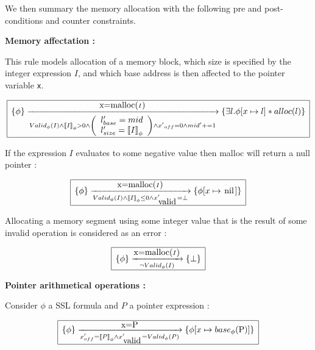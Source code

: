 \documentclass[a4paper,twoside,12pt]{report}
\newcommand{\Alloc}[1]{alloc(#1)}
\newcommand{\Unsep}[0]{\ast}
\newcommand{\Sep}[2]{#1 \Unsep #2}
\newcommand{\Pointsto}[2]{ #1 \mapsto #2}
\newcommand{\nil}[0]{\lstinline!nil!}
\newcommand{\Addrep}[2]{#1 \lbrack #2 \rbrack}
\newcommand{\base}[2]{base_{#1}(#2)}
\newcommand{\lbase}[1]{#1_{base}}
\newcommand{\lsize}[1]{#1_{size}}
\newcommand{\locvar}[3]{
\left ( \begin{array}{l}
\lbase{#1}=#2 \\
\lsize{#1}=#3
\end{array} \right )
}
\newcommand{\transmodel}[4]{\lbrace #1 \rbrace \arrow{#2}{#3} \lbrace #4 \rbrace }
\newcommand{\ptroffset}[1]{{#1}_{off}}
\newcommand{\gmallocid}[0]{mid}
\newcommand{\valid}[1]{{#1}_{\mbox{\lstinline!valid!}}}
\newcommand{\isvalid}[2]{Valid_{#1}(#2)}
\newcommand{\interpa}[2]{\sem{#2}_{#1}}
\begin{document}
We then summary the memory allocation with the following pre and post-conditions and counter constraints.

\textbf{Memory affectation :}

This rule models allocation of a memory block, which size is specified by the
integer expression $I$, and which base address is then affected to the
pointer variable \lstinline!x!.

$$
\begin{array}{|l|}
\hline
\transmodel{\phi}{\mbox{\lstinline!x=malloc(!} I \mbox{\lstinline!)!}}{\isvalid{\phi}{I} \wedge \interpa{\phi}{I} > 0 \wedge \locvar{l^{\prime}}{\gmallocid}{\interpa{\phi}{I}} \wedge \ptroffset{x^{\prime}}=0 \wedge \gmallocid^{\prime}+=1}{\Sep{\exists l. \Addrep{\phi}{\Pointsto{x}{l}}}{\Alloc{l}}} \\
\hline
\end{array}
$$ 

If the expression $I$ evaluates to some negative value then malloc will return a null pointer :

$$
\begin{array}{|l|}
\hline
\transmodel{\phi}{\mbox{\lstinline!x=malloc(!} I \mbox{\lstinline!)!}}{\isvalid{\phi}{I} \wedge \interpa{\phi}{I} \leq 0 \wedge \valid{x}^{\prime}= \bot}{\Addrep{\phi}{\Pointsto{x}{\nil}}} \\
\hline
\end{array}
$$ 

Allocating a memory segment using some integer value that is the result of some
invalid operation is considered as an error :

$$
\begin{array}{|l|}
\hline
\transmodel{\phi}{\mbox{\lstinline!x=malloc(!} I \mbox{\lstinline!)!}}{\neg \isvalid{\phi}{I}}{\bot} \\
\hline
\end{array}
$$ 


\textbf{Pointer arithmetical operations :}

Consider $\phi$ a SSL formula and $P$ a pointer expression :

$$
\begin{array}{|l|}
\hline
\transmodel{\phi}{\mbox{x=P}}{\ptroffset{x}^{\prime}=\interpa{\phi}{P} \wedge \valid{x}^{\prime}=\isvalid{\phi}{P}}{\Addrep{\phi}{\Pointsto{x}{\base{\phi}{\mbox{\lstinline!P!}}}}} \\
\hline
\end{array}
$$ 
\end{document}
